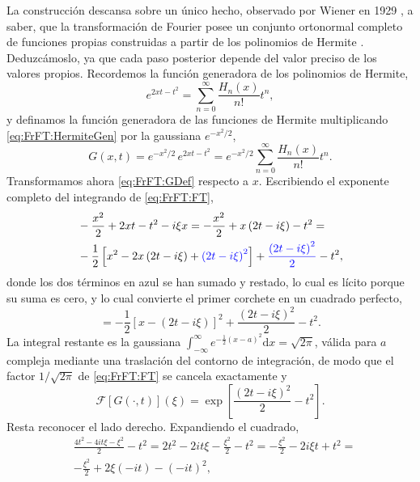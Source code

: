			La construcción descansa sobre un único hecho, observado por Wiener en 1929 \citep{wiener1929hermitian}, a saber, que la transformación de Fourier posee un conjunto ortonormal completo de funciones propias construidas a partir de los polinomios de Hermite \citep{hermite1864nouveau}. Deduzcámoslo, ya que cada paso posterior depende del valor preciso de los valores propios. Recordemos la función generadora de los polinomios de Hermite,
			\begin{equation}\label{eq:FrFT:HermiteGen}
				e^{2xt-t^{2}} = \sum_{n=0}^{\infty}\frac{H_{n}(x)}{n!}t^{n},
			\end{equation}
			y definamos la función generadora de las funciones de Hermite multiplicando \eqref{eq:FrFT:HermiteGen} por la gaussiana $e^{-x^{2}/2}$,
			\begin{equation}\label{eq:FrFT:GDef}
				G(x,t) = e^{-x^{2}/2}\,e^{2xt-t^{2}} = e^{-x^{2}/2}\sum_{n=0}^{\infty}\frac{H_{n}(x)}{n!}t^{n}.
			\end{equation}
			Transformamos ahora \eqref{eq:FrFT:GDef} respecto a $x$. Escribiendo el exponente completo del integrando de \eqref{eq:FrFT:FT},
			\begin{align*}
				& -\frac{x^{2}}{2} + 2xt - t^{2} - i\xi x = -\frac{x^{2}}{2} + x\left(2t-i\xi\right) - t^{2} = \\
				& -\frac{1}{2}\left[x^{2} - 2x\left(2t-i\xi\right) + {\color{blue}\left(2t-i\xi\right)^{2}}\right] + {\color{blue}\frac{\left(2t-i\xi\right)^{2}}{2}} - t^{2},
			\end{align*}
			donde los dos términos en azul se han sumado y restado, lo cual es lícito porque su suma es cero, y lo cual convierte el primer corchete en un cuadrado perfecto,
			\begin{equation*}
				= -\frac{1}{2}\left[x - \left(2t-i\xi\right)\right]^{2} + \frac{\left(2t-i\xi\right)^{2}}{2} - t^{2}.
			\end{equation*}
			La integral restante es la gaussiana $\int_{-\infty}^{\infty}e^{-\frac{1}{2}(x-a)^{2}}\mathrm{d}x = \sqrt{2\pi}$, válida para $a$ compleja mediante una traslación del contorno de integración, de modo que el factor $1/\sqrt{2\pi}$ de \eqref{eq:FrFT:FT} se cancela exactamente y
			\begin{equation}\label{eq:FrFT:GTransformed}
				\mathcal{F}\left[G(\cdot,t)\right](\xi) = \exp\left[\frac{\left(2t-i\xi\right)^{2}}{2} - t^{2}\right].
			\end{equation}
			Resta reconocer el lado derecho. Expandiendo el cuadrado,
			\begin{align*}
				& \frac{4t^{2} - 4it\xi - \xi^{2}}{2} - t^{2} = 2t^{2} - 2it\xi - \frac{\xi^{2}}{2} - t^{2} = -\frac{\xi^{2}}{2} - 2i\xi t + t^{2} = \\
				& -\frac{\xi^{2}}{2} + 2\xi\left(-it\right) - \left(-it\right)^{2},
			\end{align*}
